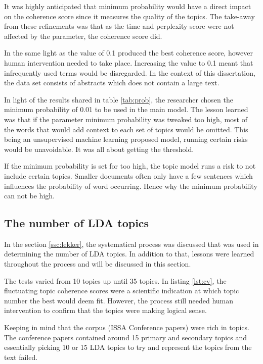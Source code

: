 It was highly anticipated that minimum probability would have a direct impact on the coherence score since it measures the quality of the topics. The take-away from these refinements was that as the time and perplexity score were not affected by the parameter, the coherence score did.

In the same light as the value of 0.1 produced the best coherence score, however human intervention needed to take place. Increasing the value to 0.1 meant that infrequently used terms would be disregarded. In the context of this dissertation, the data set consists of abstracts which does not contain a large text.

In light of the results shared in table \ref{tab:prob}, the researcher chosen the minimum probability of 0.01 to be used in the main model. The lesson learned was that if the parameter minimum probability was tweaked too high, most of the words that would add context to each set of topics would be omitted. This being an unsupervised machine learning proposed model, running certain risks would be unavoidable. It was all about getting the threshold.

\begin{lesson}
If the minimum probability is set for too high, the topic model runs a risk to not include certain topics. Smaller documents often only have a few sentences which influences the probability of word occurring. Hence why the minimum probability can not be high.
\end{lesson}\label{L:probability}

\subsection{The number of LDA topics}
In the section \ref{ssc:lekker}, the systematical process was discussed that was used in determining the number of LDA topics. In addition to that, lessons were learned throughout the process and will be discussed in this section.

The tests varied from 10 topics up until 35 topics. In listing \ref{lst:cv}, the fluctuating topic coherence scores were a scientific indication at which topic number the best would deem fit. However, the process still needed human intervention to confirm that the topics were making logical sense.

Keeping in mind that the corpus (ISSA Conference papers) were rich in topics. The conference papers contained around 15 primary and secondary topics and essentially picking 10 or 15 LDA topics to try and represent the topics from the text failed.

